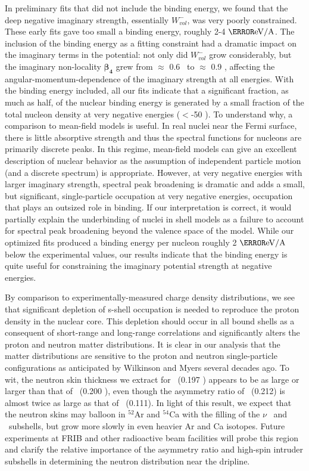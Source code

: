 In preliminary fits that did not include the binding energy,
we found that the deep negative imaginary strength, essentially $W_{vol}^{-}$,
was very poorly constrained. These early fits gave too small a binding energy,
roughly 2-4 $\mega\electronvolt/\text{A}$.
The inclusion of the binding energy as a fitting constraint
had a dramatic impact on the imaginary terms in the potential: not only did
$W_{vol}^{-}$ grow considerably,
but the imaginary non-locality $\bm{\beta_{4}}$ grew from $\approx$
0.6 \femto\meter\ to $\approx$ 0.9 \femto\meter, affecting the
angular-momentum-dependence of the imaginary strength at all energies.
With the binding energy included, all our fits indicate that a significant
fraction, as much as half, of the nuclear binding energy is generated by a small
fraction of the total nucleon density at very negative energies ($<$-50 \mega\electronvolt).
To understand why, a comparison to mean-field models is useful.
In real nuclei near the Fermi surface, there is
little absorptive strength and thus the spectral functions for nucleons are
primarily discrete peaks. In this regime,
mean-field models can give an excellent description of nuclear behavior as the
assumption of independent particle motion (and a discrete spectrum) is appropriate.
However, at very negative energies with larger imaginary strength,
spectral peak broadening is dramatic and adds a small, but significant,
single-particle occupation at very negative energies, occupation
that plays an outsized role in binding. If our interpretation is
correct, it would partially explain the underbinding of
nuclei in shell models as a failure to account for spectral peak broadening
beyond the valence space of the model. While our optimized fits produced a
binding energy per nucleon roughly 2 $\mega\electronvolt/\text{A}$ below the experimental
values, our results indicate that the binding energy is quite useful for
constraining the imaginary potential strength at negative
energies.

By comparison to experimentally-measured charge density distributions, we see 
that significant depletion of s-shell occupation is needed to reproduce the
proton density in the nuclear core. This depletion should occur in all bound
shells as a consequent of short-range and long-range correlations and
significantly alters the proton and neutron matter distributions.
It is clear in our analysis that the matter distributions are sensitive
to the proton and neutron single-particle configurations as anticipated by
Wilkinson \cite{Wilkinson1967} and Myers \cite{Myers1969} several decades ago.
To wit, the neutron skin thickness we
extract for \oEight\ (0.197 \femto\meter) appears
to be as large or larger than that of
\pbEight\ (0.200 \femto\meter), even though the asymmetry ratio of \pbEight\
(0.212) is almost twice as large as that of \oEight\ (0.111). In light of this
result, we expect that the neutron skins may balloon in $^{52}$Ar and $^{54}$Ca
with the filling of the $\nu$ \fSeven\ and \fFive\ subshells, but grow more slowly
in even heavier Ar and Ca isotopes. Future experiments at FRIB and other
radioactive beam facilities will probe this region and clarify the relative
importance of the asymmetry ratio and high-spin intruder subshells in determining
the neutron distribution near the dripline.

